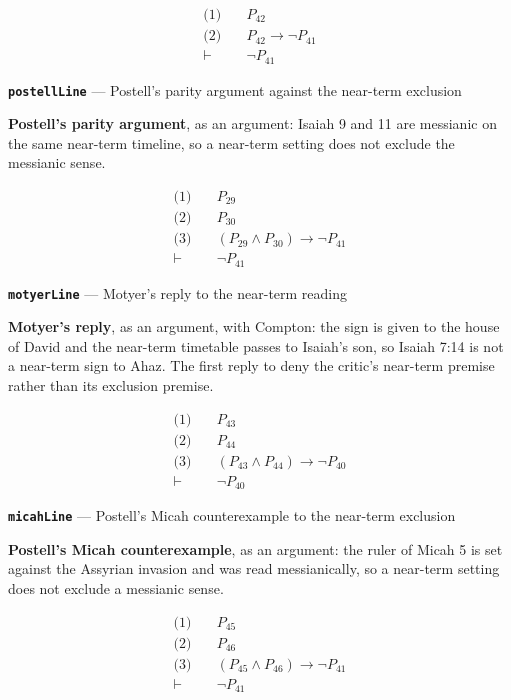 \documentclass[11pt]{article}
\begin{document}
\begin{align*}
  \text{(1)} \quad & P_{42} \\
  \text{(2)} \quad & P_{42} \rightarrow \lnot P_{41} \\
  \vdash \quad & \lnot P_{41}
\end{align*}
\par\medskip\noindent\textbf{\texttt{postell\allowbreak{}Line}} --- Postell's parity argument against the near-term exclusion\par\nobreak\noindent
\textbf{Postell's parity argument}, as an argument: Isaiah 9 and 11 are messianic on the same near-term timeline, so a near-term setting does not exclude the messianic sense.

\begin{align*}
  \text{(1)} \quad & P_{29} \\
  \text{(2)} \quad & P_{30} \\
  \text{(3)} \quad & (P_{29} \land P_{30}) \rightarrow \lnot P_{41} \\
  \vdash \quad & \lnot P_{41}
\end{align*}
\par\medskip\noindent\textbf{\texttt{motyer\allowbreak{}Line}} --- Motyer's reply to the near-term reading\par\nobreak\noindent
\textbf{Motyer's reply}, as an argument, with Compton: the sign is given to the house of David and the near-term timetable passes to Isaiah's son, so Isaiah 7:14 is not a near-term sign to Ahaz. The first reply to deny the critic's near-term premise rather than its exclusion premise.

\begin{align*}
  \text{(1)} \quad & P_{43} \\
  \text{(2)} \quad & P_{44} \\
  \text{(3)} \quad & (P_{43} \land P_{44}) \rightarrow \lnot P_{40} \\
  \vdash \quad & \lnot P_{40}
\end{align*}
\par\medskip\noindent\textbf{\texttt{micah\allowbreak{}Line}} --- Postell's Micah counterexample to the near-term exclusion\par\nobreak\noindent
\textbf{Postell's Micah counterexample}, as an argument: the ruler of Micah 5 is set against the Assyrian invasion and was read messianically, so a near-term setting does not exclude a messianic sense.

\begin{align*}
  \text{(1)} \quad & P_{45} \\
  \text{(2)} \quad & P_{46} \\
  \text{(3)} \quad & (P_{45} \land P_{46}) \rightarrow \lnot P_{41} \\
  \vdash \quad & \lnot P_{41}
\end{align*}
\end{document}
